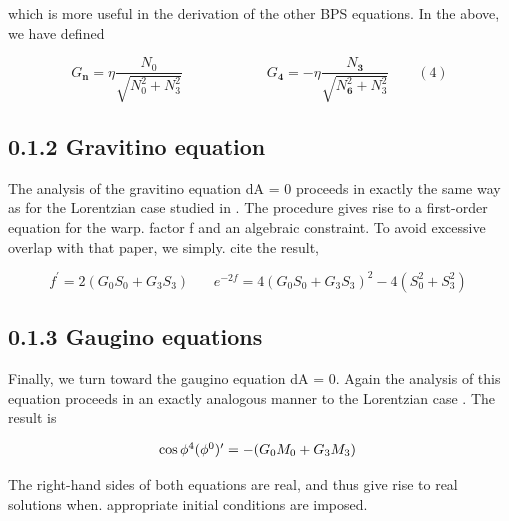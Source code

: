 \documentclass{article}
\begin{document}
which is more useful in the derivation of the other BPS equations. In the above, we have
defined


\begin{equation}
G _ { \mathbf { n } } = \eta \frac { N _ { 0 } } { \sqrt { N _ { 0 } ^ { 2 } + N _ { 3 } ^ { 2 } } } \qquad \qquad \qquad G _ { \mathbf { 4 } } = - \eta \frac { N _ { \mathbf { 3 } } } { \sqrt { N _ { \mathbf { 6 } } ^ { 2 } + N _ { 3 } ^ { 2 } } } \qquad ( 4 )
\end{equation}


\subsection*{0.1.2 Gravitino equation}


The analysis of the gravitino equation dA = 0 proceeds in exactly the same way as for the
Lorentzian case studied in . The procedure gives rise to a first-order equation for the warp.
factor f and an algebraic constraint. To avoid excessive overlap with that paper, we simply.
cite the result,


\begin{equation}
f ^ { \prime } = 2 ( G _ { 0 } S _ { 0 } + G _ { 3 } S _ { 3 } ) ~ ~ ~ ~ ~ ~ ~ ~ e ^ { - 2 f } = 4 ( G _ { 0 } S _ { 0 } + G _ { 3 } S _ { 3 } ) ^ { 2 } - 4 ( S _ { 0 } ^ { 2 } + S _ { 3 } ^ { 2 } ) ~
\end{equation}


\subsection*{0.1.3 Gaugino equations}


Finally, we turn toward the gaugino equation dA = 0. Again the analysis of this equation
proceeds in an exactly analogous manner to the Lorentzian case . The result is


\begin{equation}
\begin{array} { c c } { \cos \phi ^ { 4 } ( \phi ^ { 0 } ) ^ { \prime } = - ( G _ { 0 } M _ { 0 } + G _ { 3 } M _ { 3 } ) ~ }\end{array}
\end{equation}


The right-hand sides of both equations are real, and thus give rise to real solutions when.
appropriate initial conditions are imposed.
\end{document}
